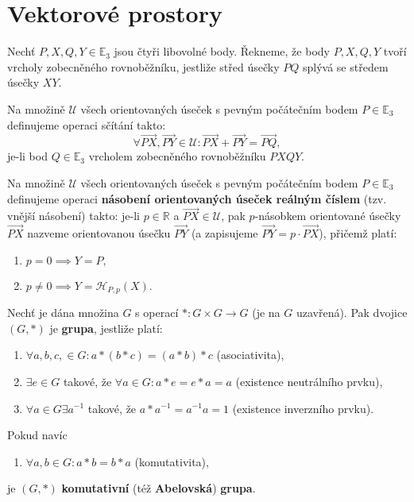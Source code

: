 \section{Vektorové prostory}
\begin{definition}
    Nechť $P, X, Q, Y\in \mathbb E_3$ jsou čtyři libovolné body. Řekneme, že body
    $P, X, Q, Y$ tvoří
    vrcholy zobecněného rovnoběžníku, jestliže střed úsečky $PQ$ splývá se středem úsečky
    $XY$.
\end{definition}

\begin{definition}
    Na množině $\mathscr U$ všech orientovaných úseček s pevným počátečním bodem
    $P\in \mathbb E_3$
    definujeme operaci sčítání takto:
    $$\forall \overrightarrow{PX}, \overrightarrow{PY} \in \mathscr U:
        \overrightarrow{PX} +  \overrightarrow{PY} = \overrightarrow{PQ},$$
    je-li bod $Q\in \mathbb E_3$
    vrcholem zobecněného rovnoběžníku $PXQY$.
\end{definition}

\begin{definition}
    Na množině $\mathscr U$ všech orientovaných úseček s pevným počátečním bodem
    $P\in \mathbb E_3$
    definujeme operaci \textbf{násobení orientovaných úseček reálným číslem}
    (tzv. vnější násobení) takto: je-li $p\in \mathbb R$ a $\overrightarrow{PX}\in \mathscr U$,
    pak $p$-násobkem orientované
    úsečky $\overrightarrow{PX}$ nazveme orientovanou úsečku $\overrightarrow{PY}$
    (a zapisujeme $\overrightarrow{PY}=p \cdot \overrightarrow{PX}$), přičemž
    platí:
    \begin{enumerate}[$i.$]
    \item $p=0 \implies Y=P,$
   	\item $p\ne 0 \implies Y = \mathscr H_{P,p}(X).$
    \end{enumerate}
\end{definition}

\begin{definition}
    Nechť je dána množina $G$ s operací $*:G\times G \to G$ (je na $G$ uzavřená).
    Pak dvojice $(G,*)$ je \textbf{grupa}, jestliže platí:
    \begin{enumerate}[$i.$]
        \item $\forall a,b,c, \in G: a*(b*c) = (a*b)*c$ (asociativita),
       	\item $\exists e \in G$ takové, že $\forall a\in G: a*e=e*a=a$ (existence neutrálního prvku),
       	\item $\forall a\in G \exists a^{-1}$ takové, že $a*a^{-1}=a^{-1}a=1$ (existence inverzního prvku).
    \end{enumerate}
    Pokud navíc
    \begin{enumerate}[$iv.$]
        \item $\forall a,b \in G: a*b=b*a$ (komutativita),
    \end{enumerate}
    je $(G,*)$ \textbf{komutativní} (též \textbf{Abelovská}) \textbf{grupa}.
\end{definition}

